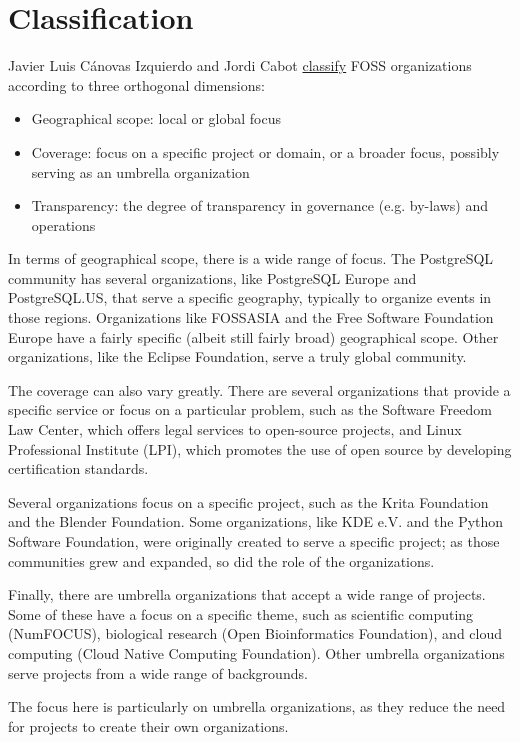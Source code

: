 


\chapter{Classification}

Javier Luis Cánovas Izquierdo and Jordi Cabot \href{https://arxiv.org/pdf/2005.10063.pdf}{classify} FOSS organizations according to three orthogonal dimensions:

\begin{itemize}

\itemsep 0.50em

\item Geographical scope: local or global focus

\item Coverage: focus on a specific project or domain, or a broader focus, possibly serving as an umbrella organization

\item Transparency: the degree of transparency in governance (e.g. by-laws) and operations

\end{itemize}

In terms of geographical scope, there is a wide range of focus.  The PostgreSQL community has several organizations, like PostgreSQL Europe and PostgreSQL.US, that serve a specific geography, typically to organize events in those regions.  Organizations like FOSSASIA and the Free Software Foundation Europe have a fairly specific (albeit still fairly broad) geographical scope.  Other organizations, like the Eclipse Foundation, serve a truly global community.

The coverage can also vary greatly.  There are several organizations that provide a specific service or focus on a particular problem, such as the Software Freedom Law Center, which offers legal services to open-source projects, and Linux Professional Institute (LPI), which promotes the use of open source by developing certification standards.

Several organizations focus on a specific project, such as the Krita Foundation and the Blender Foundation.  Some organizations, like KDE e.V. and the Python Software Foundation, were originally created to serve a specific project; as those communities grew and expanded, so did the role of the organizations.

Finally, there are umbrella organizations that accept a wide range of projects.  Some of these have a focus on a specific theme, such as scientific computing (NumFOCUS), biological research (Open Bioinformatics Foundation), and cloud computing (Cloud Native Computing Foundation).  Other umbrella organizations serve projects from a wide range of backgrounds.

The focus here is particularly on umbrella organizations, as they reduce the need for projects to create their own organizations.

